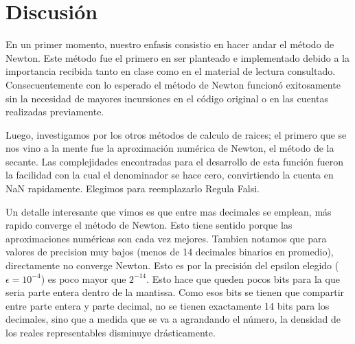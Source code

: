 \section{Discusi\'on}

En un primer momento, nuestro enfasis consistio en hacer andar el m\'etodo de Newton.
Este m\'etodo fue el primero en ser planteado e implementado debido a la
importancia recibida tanto en clase como en el material de lectura consultado.
Consecuentemente con lo esperado el m\'etodo de Newton funcion\'o exitosamente
sin la necesidad de mayores incursiones en el c\'odigo original o en las cuentas
realizadas previamente.

Luego, investigamos por los otros m\'etodos de calculo de raices; el primero que se nos vino a la mente
fue la aproximaci\'on num\'erica de Newton, el m\'etodo de la secante.
Las complejidades encontradas para el desarrollo de esta funci\'on fueron la facilidad con la cual
el denominador se hace cero, convirtiendo la cuenta en NaN rapidamente. Elegimos para reemplazarlo
Regula Falsi.


Un detalle interesante que vimos es que entre mas decimales se emplean, m\'as rapido converge el m\'etodo de Newton. 
Esto tiene sentido porque las aproximaciones num\'ericas son cada vez mejores. 
Tambien notamos que para valores de precision muy bajos (menos de 14 decimales binarios en promedio), directamente no converge Newton. 
Esto es por la precisi\'on del epsilon elegido ($\epsilon = 10^{-4}$) es poco mayor que $2^{-14}$. Esto hace que queden pocos bits para la que seria
parte entera dentro de la mantissa. Como esos bits se tienen que compartir entre parte entera y parte decimal, no se tienen exactamente
14 bits para los decimales, sino que a medida que se va a agrandando el n\'umero, la densidad de los reales representables disminuye dr\'asticamente.



